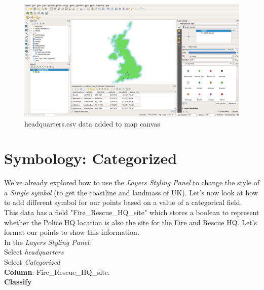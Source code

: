 \begin{figure}[!h]
	\centering
	\includegraphics[width=1\textwidth]{images/headquarters_added_to_map.png}
	\caption{headquarters.csv data added to map canvas}
	\label{ft_fig_firstfig3}
\end{figure}



\section{Symbology: Categorized}

We've already explored how to use the \textit{Layers Styling Panel} to change the style of a \textit{Single symbol} (to get the coastline and landmass of UK). Let's now look at how to add different symbol for our points based on a value of a categorical field.\\

This data has a field "Fire\_Rescue\_HQ\_site" which stores a boolean to represent whether the Police HQ location is also the site for the Fire and Rescue HQ. Let's format our points to show this information.\\

In the \textit{Layers Styling Panel}:\\
Select \textit{headquarters}\\
Select \textit{Categorized}\\
\textbf{Column}: Fire\_Rescue\_HQ\_site.  \\
\textbf{Classify}\\


